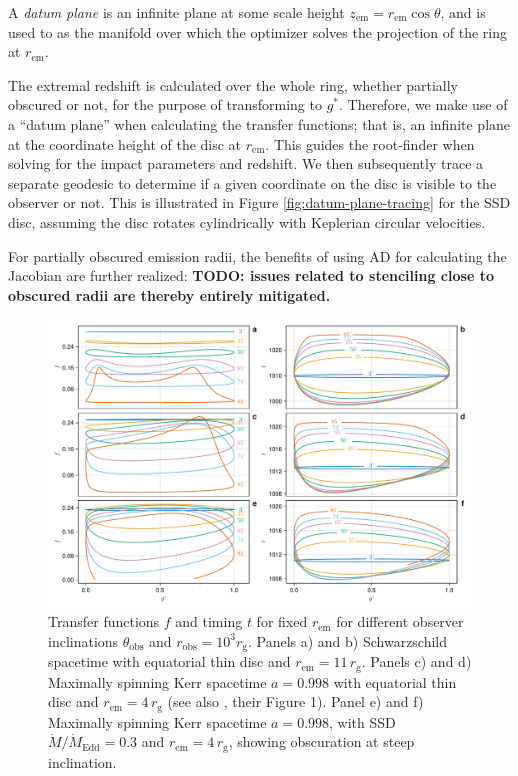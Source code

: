 \documentclass[fleqn,usenatbib]{mnras}
\newcommand{\todo}[1]{{\noindent \bf \color{red} TODO: #1}}
\newcommand{\rg}{r_\text{g}}
\begin{document}
A \emph{datum plane} is an infinite plane at some scale height $z_\text{em} =
r_\text{em} \cos \theta$, and is used to as the manifold over which the
optimizer solves the projection of the ring at $r_\text{em}$.

The extremal redshift is calculated over
the whole ring, whether partially obscured or not, for the purpose of
transforming to $g^\ast$. Therefore, we make use of a ``datum plane'' when
calculating the transfer functions; that is, an infinite plane at the coordinate
height of the disc at $r_\text{em}$. This guides the root-finder when solving
for the impact parameters and redshift. We then subsequently trace a separate
geodesic to determine if a given coordinate on the disc is visible to the
observer or not. This is illustrated in Figure \ref{fig:datum-plane-tracing} for
the SSD disc, assuming the disc rotates cylindrically with Keplerian circular
velocities.

For partially obscured emission radii, the benefits of using AD for calculating the Jacobian are further realized: \todo{issues related to stenciling close to obscured radii are thereby entirely mitigated.}


\begin{figure}
    \centering
    \includegraphics[width=0.99\linewidth]{figures/transfer-functions.plots.pdf}
    \caption{Transfer functions $f$ and timing $t$ for fixed $r_\text{em}$ for different observer inclinations $\theta_\text{obs}$ and $r_\text{obs} = 10^3 \rg$. Panels a) and b) Schwarzschild spacetime with equatorial thin disc and $r_\text{em} = 11\, \rg$. Panels c) and d) Maximally spinning Kerr spacetime $a=0.998$ with equatorial thin disc and $r_\text{em} = 4 \, \rg$ (see also \citealp{bambi_testing_2017}, their Figure 1). Panel e) and f) Maximally spinning Kerr spacetime $a=0.998$, with SSD $\dot{M} / \dot{M}_\text{Edd} = 0.3$ and $r_\text{em} = 4\, \rg$, showing obscuration at steep inclination.}
    \label{fig:transfer-functions}
\end{figure}
\end{document}
